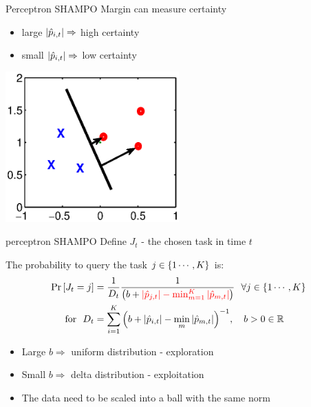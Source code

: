 \documentclass{beamer}
\begin{document}
\begin{frame}{Perceptron SHAMPO }
Margin can measure certainty \newline
\begin{itemize}
\item large $\left\vert{\hat{p}_{i,t}}\right\vert\Rightarrow$ high certainty\newline
\item small $\left\vert{\hat{p}_{i,t}}\right\vert\Rightarrow$ low certainty
\end{itemize}
\begin{center}
\includegraphics[width=0.5\textwidth]{figs/margin.eps}
\end{center}
\end{frame}

\begin{frame}{perceptron SHAMPO }
Define $J_t$ - the chosen task in time $t$\newline

The probability to query the task $j\in\left\{{1\cdots,K}\right\}$ is:\newline
\begin{equation*}
\begin{aligned}
 {\rm Pr}\left[{J_t=j}\right]&=\frac{1}{D_t}\frac{1}{\left({b+\textcolor{red}{\left\vert{\hat{p}_{j,t}}\right\vert-\min_{m=1}^K\left\vert{\hat{p}_{m,t}}\right\vert}}\right)} ~~\forall j\in\left\{{1\cdots,K}\right\}\\
~ \textrm{ for }~
D_{t}&=\sum_{i=1}^{K}{\left({b+\left\vert{\hat{p}_{i,t}}\right\vert-\min_{m}\left\vert{\hat{p}_{m,t}}\right\vert}\right)^{-1}},~~~  b>0\in\mathbb{R}
\end{aligned}
\end{equation*}
\begin{itemize}
\item Large $b\Rightarrow$ uniform distribution - exploration \newline
\item Small $b\Rightarrow$ delta distribution - exploitation\newline
\item The data need to be  scaled into a ball with the same norm
\end{itemize}
\end{frame}
\end{document}
